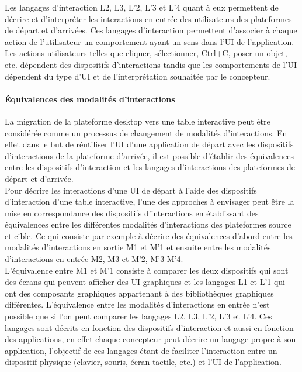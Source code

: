 Les langages d'interaction L2, L3, L'2, L'3 et L'4 quant à eux permettent de décrire et d'interpréter les interactions en entrée des utilisateurs des plateformes de départ et d'arrivées. Ces langages d'interaction permettent d'associer à chaque action de l'utilisateur un comportement ayant un sens dans l'UI de l'application. Les actions utilisateurs telles que cliquer, sélectionner, Ctrl+C, poser un objet, etc. dépendent des dispositifs d'interactions tandis que les comportements de l'UI dépendent du type d'UI et de l'interprétation souhaitée par le concepteur.\\

\paragraph{Équivalences des modalités d'interactions}
La migration de la plateforme desktop vers une table interactive peut être considérée comme un processus de changement de modalités d'interactions. En effet dans le but de réutiliser l'UI d'une application de départ avec les dispositifs d'interactions de la plateforme d'arrivée, il est possible d'établir des équivalences entre les dispositifs d'interaction et les langages d'interactions des plateformes de départ et d'arrivée.\\
Pour décrire les interactions d'une UI de départ à l'aide des dispositifs d'interaction d'une table interactive, l'une des approches à envisager peut être la mise en correspondance des dispositifs d'interactions en établissant des équivalences entre les différentes modalités d'interactions des plateformes source et cible. Ce qui consiste par exemple à décrire des équivalences d'abord entre les modalités d'interactions en sortie  M1 et M'1 et ensuite entre les modalités d'interactions en entrée M2, M3 et M'2, M'3 M'4.\\
L'équivalence entre M1 et M'1 consiste à comparer les deux dispositifs qui sont des écrans qui peuvent afficher des UI graphiques et les langages L1 et L'1 qui ont des composants graphiques appartenant à des bibliothèques graphiques différentes.
L'équivalence entre les modalités d'interactions en entrée n'est possible que si l'on peut comparer les langages L2, L3, L'2, L'3 et L'4. Ces langages sont décrits en fonction des dispositifs d'interaction et aussi en fonction des applications, en effet chaque concepteur peut décrire un langage propre à son application, l'objectif de ces langages étant de faciliter l'interaction entre un dispositif physique (clavier, souris, écran tactile, etc.) et l'UI de l'application.



